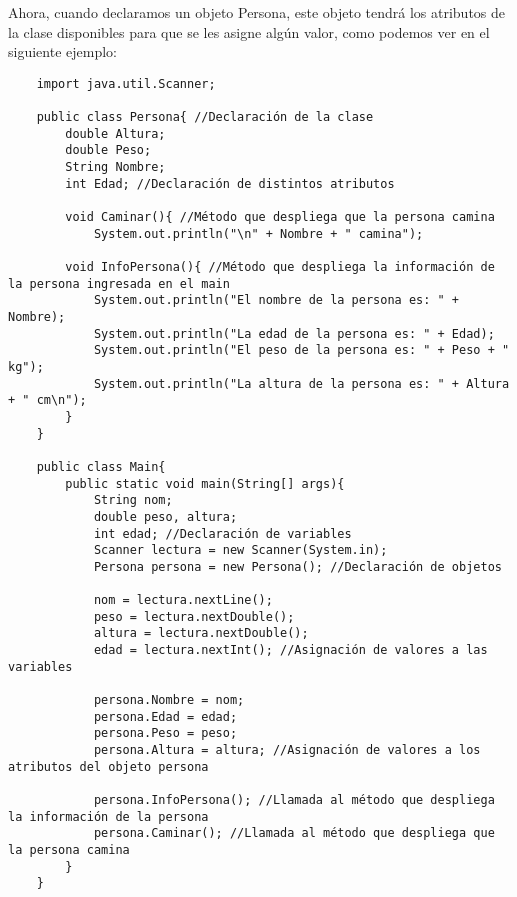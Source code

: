 Ahora, cuando declaramos un objeto Persona, este objeto tendrá los atributos de la clase disponibles para que se les asigne algún valor, como podemos ver en el siguiente ejemplo:
\begin{lstlisting}
    import java.util.Scanner;
    
    public class Persona{ //Declaración de la clase
        double Altura;
        double Peso;
        String Nombre;
        int Edad; //Declaración de distintos atributos
    
        void Caminar(){ //Método que despliega que la persona camina 
            System.out.println("\n" + Nombre + " camina");
        
        void InfoPersona(){ //Método que despliega la información de la persona ingresada en el main
            System.out.println("El nombre de la persona es: " + Nombre);
            System.out.println("La edad de la persona es: " + Edad);
            System.out.println("El peso de la persona es: " + Peso + " kg");
            System.out.println("La altura de la persona es: " + Altura + " cm\n");
        }
    }
    
    public class Main{
        public static void main(String[] args){
            String nom;
            double peso, altura;
            int edad; //Declaración de variables
            Scanner lectura = new Scanner(System.in);
            Persona persona = new Persona(); //Declaración de objetos
            
            nom = lectura.nextLine();
            peso = lectura.nextDouble();
            altura = lectura.nextDouble();
            edad = lectura.nextInt(); //Asignación de valores a las variables
            
            persona.Nombre = nom;
            persona.Edad = edad;
            persona.Peso = peso;
            persona.Altura = altura; //Asignación de valores a los atributos del objeto persona
            
            persona.InfoPersona(); //Llamada al método que despliega la información de la persona
            persona.Caminar(); //Llamada al método que despliega que la persona camina
        }
    }
\end{lstlisting}



